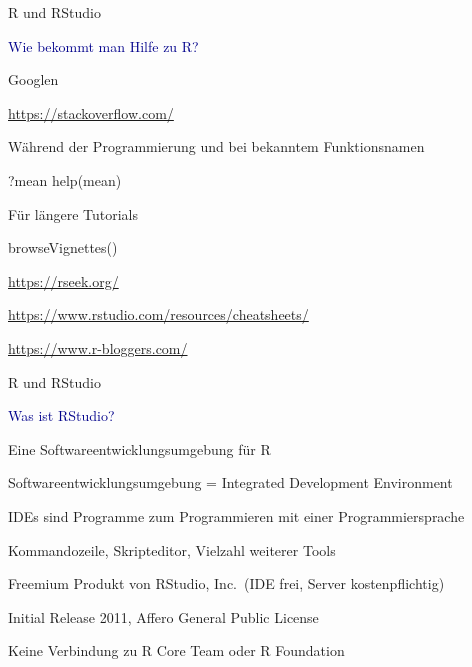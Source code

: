 \documentclass[
  8pt,
  ignorenonframetext,
]{beamer}
\newenvironment{Shaded}{\begin{snugshade}}{\end{snugshade}}
\newcommand{\FunctionTok}[1]{\textcolor[rgb]{0.00,0.00,0.00}{#1}}
\newcommand{\NormalTok}[1]{#1}
\begin{document}
\begin{frame}[fragile]{R und RStudio}
\protect\hypertarget{r-und-rstudio-3}{}
\large

\textcolor{darkblue}{Wie bekommt man Hilfe zu R?} \normalsize

Googlen

\url{https://stackoverflow.com/}

Während der Programmierung und bei bekanntem Funktionsnamen

\begin{Shaded}
\begin{Highlighting}[]
\NormalTok{?mean}
\FunctionTok{help}\NormalTok{(mean)}
\end{Highlighting}
\end{Shaded}

Für längere Tutorials

\begin{Shaded}
\begin{Highlighting}[]
\FunctionTok{browseVignettes}\NormalTok{()}
\end{Highlighting}
\end{Shaded}

\url{https://rseek.org/}

\url{https://www.rstudio.com/resources/cheatsheets/}

\url{https://www.r-bloggers.com/}
\end{frame}

\begin{frame}{R und RStudio}
\protect\hypertarget{r-und-rstudio-4}{}
\large

\textcolor{darkblue}{Was ist RStudio?} \normalsize

Eine Softwareentwicklungsumgebung für R

Softwareentwicklungsumgebung = Integrated Development Environment

IDEs sind Programme zum Programmieren mit einer Programmiersprache

Kommandozeile, Skripteditor, Vielzahl weiterer Tools

Freemium Produkt von RStudio, Inc.~(IDE frei, Server kostenpflichtig)

Initial Release 2011, Affero General Public License

Keine Verbindung zu R Core Team oder R Foundation
\end{frame}
\end{document}
